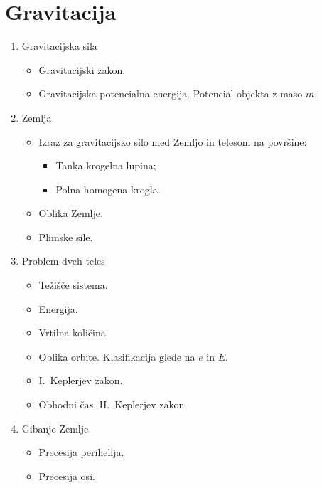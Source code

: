 \section{Gravitacija}
\begin{enumerate}
    \item Gravitacijska sila
    \begin{itemize}
        \item Gravitacijski zakon.
        \item Gravitacijska potencialna energija. Potencial objekta z maso \(m\).
    \end{itemize}

    \item Zemlja
    \begin{itemize}
        \item Izraz za gravitacijsko silo med Zemljo in telesom na površine:
        \begin{itemize}
            \item Tanka krogelna lupina;
            \item Polna homogena krogla.
        \end{itemize}
        \item Oblika Zemlje.
        \item Plimske sile.
    \end{itemize}

    \item Problem dveh teles
    \begin{itemize}
        \item Težišče sistema.
        \item Energija.
        \item Vrtilna količina.
        \item Oblika orbite. Klasifikacija glede na \(e\) in \(E\).
        \item I.\ Keplerjev zakon.
        \item Obhodni čas. II.\ Keplerjev zakon.
    \end{itemize}

    \item Gibanje Zemlje
    \begin{itemize}
        \item Precesija perihelija.
        \item Precesija osi.
    \end{itemize}
\end{enumerate}

\newpage
